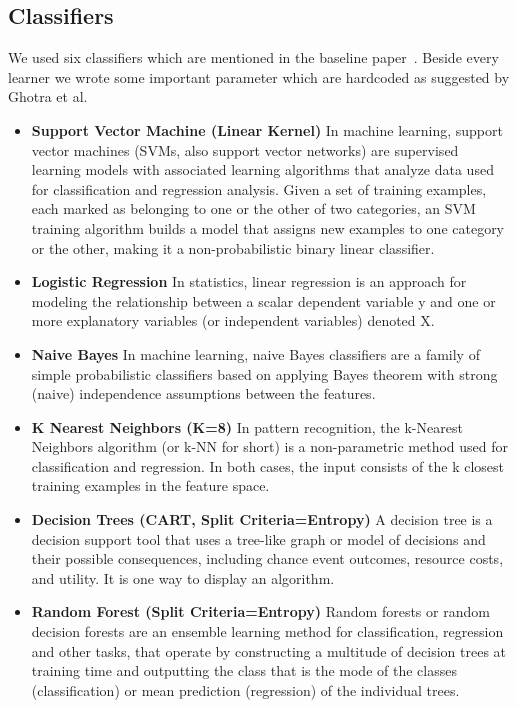 \documentclass[conference]{IEEEtran}
\begin{document}
\subsection{\textbf{Classifiers}}
We used six classifiers which are mentioned in the baseline paper~\cite{ghotra2015revisiting}. Beside every learner we wrote some important parameter which are hardcoded as suggested by Ghotra et al.
\begin{itemize}
 \item \textbf{Support Vector Machine (Linear Kernel)}
 In machine learning, support vector machines (SVMs, also support vector networks) are supervised learning models with associated learning algorithms that analyze data used for classification and regression analysis. Given a set of training examples, each marked as belonging to one or the other of two categories, an SVM training algorithm builds a model that assigns new examples to one category or the other, making it a non-probabilistic binary linear classifier.
 \item \textbf{Logistic Regression}
 In statistics, linear regression is an approach for modeling the relationship between a scalar dependent variable y and one or more explanatory variables (or independent variables) denoted X.
 \item \textbf{Naive Bayes}
 In machine learning, naive Bayes classifiers are a family of simple probabilistic classifiers based on applying Bayes theorem with strong (naive) independence assumptions between the features.
 \item \textbf{K Nearest Neighbors (K=8)}
 In pattern recognition, the k-Nearest Neighbors algorithm (or k-NN for short) is a non-parametric method used for classification and regression. In both cases, the input consists of the k closest training examples in the feature space.
 \item \textbf{Decision Trees (CART, Split Criteria=Entropy)}
 A decision tree is a decision support tool that uses a tree-like graph or model of decisions and their possible consequences, including chance event outcomes, resource costs, and utility. It is one way to display an algorithm.
 \item \textbf{Random Forest (Split Criteria=Entropy)}
 Random forests or random decision forests are an ensemble learning method for classification, regression and other tasks, that operate by constructing a multitude of decision trees at training time and outputting the class that is the mode of the classes (classification) or mean prediction (regression) of the individual trees. 
\end{itemize}
\end{document}
